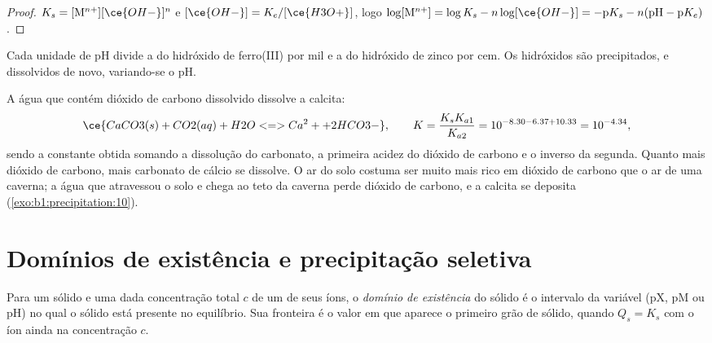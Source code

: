 \begin{proof}
$K_s = [\mathrm{M}^{n+}][\ce{OH-}]^n$ e $[\ce{OH-}] = K_e/[\ce{H3O+}]$,
logo $\log[\mathrm{M}^{n+}] = \log K_s - n\log[\ce{OH-}] = -\mathrm{p}K_s -
n(\mathrm{pH} - \mathrm{p}K_e)$.
\end{proof}

Cada unidade de pH divide a  do hidróxido de ferro(III) por
mil e a do hidróxido de zinco por cem. Os hidróxidos são precipitados,
e dissolvidos de novo, variando-se o pH.

\begin{example}\label{ex:b1:precipitation:cave}
A água que contém dióxido de carbono dissolvido dissolve a calcita:
\[
  \ce{CaCO3(s) + CO2(aq) + H2O <=> Ca^2+ + 2HCO3-}, \qquad
  K = \frac{K_s K_{a1}}{K_{a2}} = 10^{-8.30 - 6.37 + 10.33} = 10^{-4.34} ,
\]
sendo a constante obtida somando a dissolução do carbonato, a primeira
acidez do dióxido de carbono e o inverso da segunda. Quanto mais dióxido
de carbono, mais carbonato de cálcio se dissolve. O ar do solo costuma
ser muito mais rico em dióxido de carbono que o ar de uma caverna; a
água que atravessou o solo e chega ao teto da caverna perde dióxido de
carbono, e a calcita se deposita (\cref{exo:b1:precipitation:10}).
\end{example}

\section{Domínios de existência e precipitação seletiva}\label{sec:b1:precipitation:domains}

\begin{definition}\label{def:b1:precipitation:existence-domain}
Para um sólido e uma dada concentração total $c$ de um de seus íons, o
\emph{domínio de existência} do sólido é o
intervalo da variável (pX, pM ou pH) no qual o sólido está presente no
equilíbrio. Sua fronteira é o valor em que aparece o primeiro grão de
sólido, quando $Q_s = K_s$ com o íon ainda na concentração $c$.
\end{definition}

